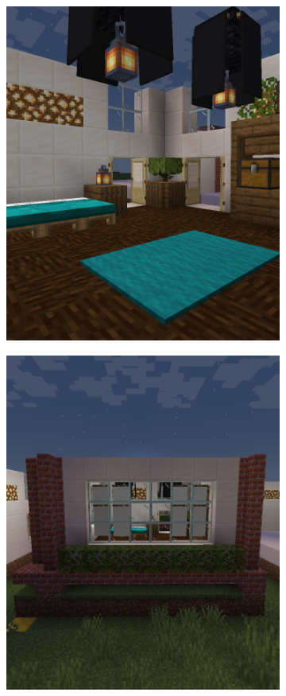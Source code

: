\documentclass[
oneside,
fontsize=11pt
]{scrartcl}
\begin{document}
\begin{figure}[ht]
\begin{subfigure}[t]{0.3\textwidth}
      \includegraphics[width=\textwidth]{images/interior/corner-bedroom-lights.png}
  \end{subfigure}
  \hfill
  \begin{subfigure}[t]{0.3\textwidth}
      \includegraphics[width=\textwidth]{images/interior/corner-bedroom.png}

\end{subfigure}
\end{figure}
\end{document}
